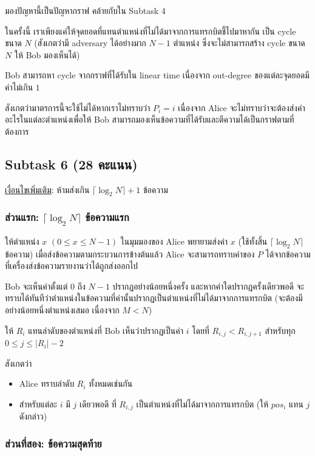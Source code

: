 \documentclass[12pt]{article}
\begin{document}
มองปัญหานี้เป็นปัญหากราฟ คล้ายกับใน Subtask 4

ในครั้งนี้ เราเพียงแค่ให้จุดยอดที่แทนตำแหน่งที่ไม่ได้มาจากการแทรกบิตชี้ไปมาหากัน เป็น cycle ขนาด $N$  (สังเกตว่ามี adversary ได้อย่างมาก $N-1$  ตำแหน่ง ซึ่งจะไม่สามารถสร้าง cycle ขนาด $N$  ให้ Bob มองเห็นได้)

Bob สามารถหา cycle จากกราฟที่ได้รับใน linear time เนื่องจาก out-degree ของแต่ละจุดยอดมีค่าไม่เกิน $1$

สังเกตว่ามาตรการนี้จะใช้ไม่ได้หากเราไม่ทราบว่า $P_i = i$ เนื่องจาก Alice จะไม่ทราบว่าจะต้องส่งค่าอะไรในแต่ละตำแหน่งเพื่อให้ Bob สามารถมองเห็นข้อความที่ได้รับและตีความได้เป็นกราฟตามที่ต้องการ

\subsection{Subtask 6 (28 คะแนน)}

\underline{เงื่อนไขเพิ่มเติม}: ห้ามส่งเกิน $\lceil \log_2 N \rceil + 1$ ข้อความ

\subsubsection{ส่วนแรก: $\lceil \log_2 N \rceil$ ข้อความแรก}

ให้ตำแหน่ง $x$ $(0 \leq x \leq N-1)$ ในมุมมองของ Alice พยายามส่งค่า $x$    (ใช้ทั้งสิ้น $\lceil \log_2 N \rceil$ ข้อความ)  เมื่อส่งข้อความตามกระบวนการข้างต้นแล้ว Alice จะสามารถทราบค่าของ $P$ ได้จากข้อความที่เครื่องส่งข้อความรายงานว่าได้ถูกส่งออกไป

Bob จะเห็นค่าตั้งแต่ $0$ ถึง $N-1$ ปรากฏอย่างน้อยหนึ่งครั้ง และหากค่าใดปรากฏครั้งเดียวพอดี จะทราบได้ทันทีว่าตำแหน่งในข้อความที่ค่านั้นปรากฏเป็นตำแหน่งที่ไม่ได้มาจากการแทรกบิต (จะต้องมีอย่างน้อยหนึ่งตำแหน่งเสมอ เนื่องจาก $M < N$)

ให้ $R_i$  แทนลำดับของตำแหน่งที่ Bob เห็นว่าปรากฏเป็นค่า $i$ โดยที่ $R_{i, j} < R_{i, j+1}$  สำหรับทุก $0 \leq j \leq |R_i|-2$

สังเกตว่า
\begin{itemize}
\item Alice ทราบลำดับ $R_i$  ทั้งหมดเช่นกัน
\item สำหรับแต่ละ $i$ มี $j$ เดียวพอดี ที่ $R_{i,j}$ เป็นตำแหน่งที่ไม่ได้มาจากการแทรกบิต (ให้ $pos_i$  แทน $j$  ดังกล่าว)
\end{itemize}

\subsubsection{ส่วนที่สอง: ข้อความสุดท้าย}
\end{document}
